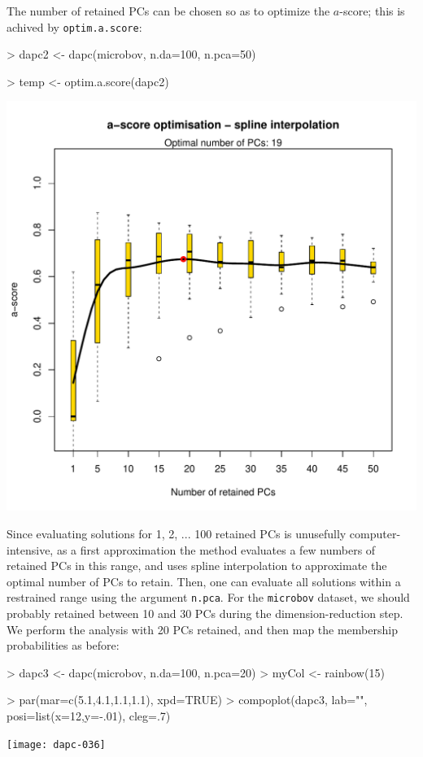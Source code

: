 \documentclass{article}
\begin{document}
The number of retained PCs can be chosen so as to optimize the $a$-score; this is achived by \texttt{optim.a.score}:
\begin{Schunk}
\begin{Sinput}
> dapc2 <- dapc(microbov, n.da=100, n.pca=50)
\end{Sinput}
\end{Schunk}
\begin{Schunk}
\begin{Sinput}
> temp <- optim.a.score(dapc2)
\end{Sinput}
\end{Schunk}
\begin{center}
  \includegraphics[width=.7\textwidth]{ascore.pdf}
\end{center}


\noindent Since evaluating solutions for 1, 2, ... 100 retained PCs is unusefully computer-intensive, as a first approximation the
method evaluates a few numbers of retained PCs in this range, and uses spline interpolation to
approximate the optimal number of PCs to retain. Then, one can evaluate all solutions within a
restrained range using the argument \texttt{n.pca}.
For the \texttt{microbov} dataset, we should probably retained between 10 and 30 PCs during the
dimension-reduction step.
\\

We perform the analysis with 20 PCs retained, and then map the membership probabilities as before:
\begin{Schunk}
\begin{Sinput}
> dapc3 <- dapc(microbov, n.da=100, n.pca=20)
> myCol <- rainbow(15)
\end{Sinput}
\end{Schunk}
\begin{Schunk}
\begin{Sinput}
> par(mar=c(5.1,4.1,1.1,1.1), xpd=TRUE)
> compoplot(dapc3, lab="", posi=list(x=12,y=-.01), cleg=.7)
\end{Sinput}
\end{Schunk}
\texttt{[image: dapc-036]}
\end{document}

